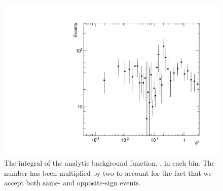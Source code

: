 \begin{figure}[!htbp]
    \centering
    \includegraphics[width=\textwidth]{figures/qcd_phistar.pdf}
    \caption[
        The integral of the analytic background function in each \phistar bin.
    ]{
        The integral of the analytic background function, \BGFunc, in each
        \phistar bin. The number has been multiplied by two to account for the
        fact that we accept both same- and opposite-sign events.
    }
    \label{fig:qcd_phistar}
\end{figure}

